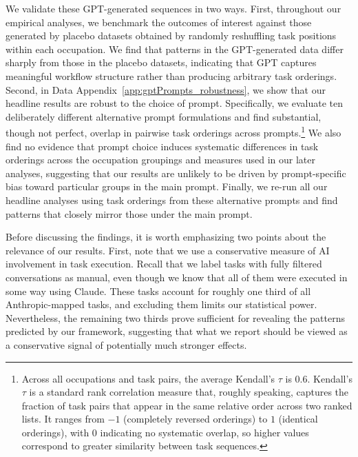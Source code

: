 We validate these GPT-generated sequences in two ways. 
First, throughout our empirical analyses, we benchmark the outcomes of interest against those generated by placebo datasets obtained by randomly reshuffling task positions within each occupation. 
We find that patterns in the GPT-generated data differ sharply from those in the placebo datasets, indicating that GPT captures meaningful workflow structure rather than producing arbitrary task orderings. 
Second, in Data Appendix~\ref{app:gptPrompts_robustness}, we show that our headline results are robust to the choice of prompt. 
Specifically, we evaluate ten deliberately different alternative prompt formulations and find substantial, though not perfect, overlap in pairwise task orderings across prompts.\footnote{%
Across all occupations and task pairs, the average Kendall's $\tau$ is 0.6.
Kendall's $\tau$ is a standard rank correlation measure that, roughly speaking, captures the fraction of task pairs that appear in the same relative order across two ranked lists.
It ranges from $-1$ (completely reversed orderings) to $1$ (identical orderings), with $0$ indicating no systematic overlap, so higher values correspond to greater similarity between task sequences.%
} 
We also find no evidence that prompt choice induces systematic differences in task orderings across the occupation groupings and measures used in our later analyses, suggesting that our results are unlikely to be driven by prompt-specific bias toward particular groups in the main prompt.
Finally, we re-run all our headline analyses using task orderings from these alternative prompts and find patterns that closely mirror those under the main prompt. 

Before discussing the findings, it is worth emphasizing two points about the relevance of our results.
First, note that we use a conservative measure of AI involvement in task execution.
Recall that we label tasks with fully filtered conversations as manual, even though we know that all of them were executed in some way using Claude.
These tasks account for roughly one third of all Anthropic-mapped tasks, and excluding them limits our statistical power.
Nevertheless, the remaining two thirds prove sufficient for revealing the patterns predicted by our framework, suggesting that what we report should be viewed as a conservative signal of potentially much stronger effects.

